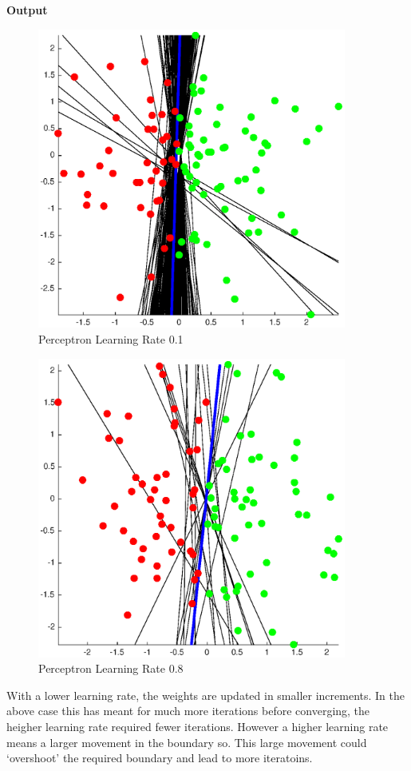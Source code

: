 \documentclass{article}
\begin{document}

\textbf{Output}
\begin{figure}[H]
\centering
\includegraphics[width=4in]{ass2Code/4a.eps}
\caption{Perceptron Learning Rate 0.1}
\end{figure}
\begin{figure}[H]
\centering
\includegraphics[width=4in]{ass2Code/4b.eps}
\caption{Perceptron Learning Rate 0.8}
\end{figure}

With a lower learning rate, the weights are updated in smaller increments. In the above case this has meant for much more iterations before converging, the heigher learning rate required fewer iterations. However a higher learning rate means a larger movement in the boundary so. This large movement could `overshoot' the required boundary and lead to more iteratoins.
 
\end{document}
